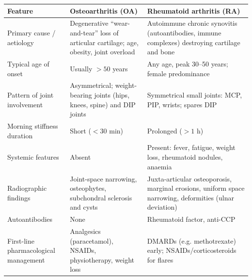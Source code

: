 \documentclass[11pt]{article}
\begin{document}
\begin{corrige}
\begin{center}
\begin{tabularx}{\linewidth}{|l|X|X|}
\hline
\rowcolor{popblueL}
\textbf{Feature} & \textbf{Osteoarthritis (OA)} & \textbf{Rheumatoid arthritis (RA)} \\
\hline
Primary cause / aetiology & Degenerative ``wear-and-tear'' loss of articular cartilage; age, obesity, joint overload & Autoimmune chronic synovitis (autoantibodies, immune complexes) destroying cartilage and bone \\
\hline
Typical age of onset & Usually $>50$ years & Any age, peak 30--50 years; female predominance \\
\hline
Pattern of joint involvement & Asymmetrical; weight-bearing joints (hips, knees, spine) and DIP joints & Symmetrical small joints: MCP, PIP, wrists; spares DIP \\
\hline
Morning stiffness duration & Short ($<30$ min) & Prolonged ($>1$ h) \\
\hline
Systemic features & Absent & Present: fever, fatigue, weight loss, rheumatoid nodules, anaemia \\
\hline
Radiographic findings & Joint-space narrowing, osteophytes, subchondral sclerosis and cysts & Juxta-articular osteoporosis, marginal erosions, uniform space narrowing, deformities (ulnar deviation) \\
\hline
Autoantibodies & None & Rheumatoid factor, anti-CCP \\
\hline
First-line pharmacological management & Analgesics (paracetamol), NSAIDs, physiotherapy, weight loss & DMARDs (e.g. methotrexate) early; NSAIDs/corticosteroids for flares \\
\hline
\end{tabularx}
\end{center}
\end{corrige}
\end{document}
